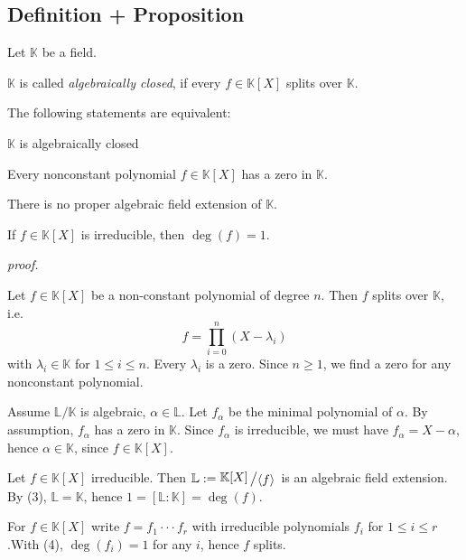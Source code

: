 \documentclass[12pt]{book}
\newcommand{\slant}[2]{{\raisebox{.1em}{$#1$}\left/\raisebox{-.1em}{$#2$}\right.}}
\begin{document}
\begin{spacing}{1.3}
\begin{compactenum}
\end{compactenum}

\subsection{Definition + Proposition} %
Let $\mathbb{K}$ be a field.
\begin{compactenum}
\item $\mathbb{K}$ is called \textit{algebraically closed}, if every $f \in \mathbb{K}[X]$ splits over $\mathbb{K}$.
\item The following statements are equivalent:
\begin{compactenum}
\item $\mathbb{K}$ is algebraically closed
\item Every nonconstant polynomial $f \in \mathbb{K}[X]$ has a zero in $\mathbb{K}$.
\item There is no proper algebraic field extension of $\mathbb{K}$.
\item If $f \in \mathbb{K}[X]$ is irreducible, then $\deg(f)=1$.
\end{compactenum}
\end{compactenum}
\textit{proof.}
\begin{compactitem}
\item['(1) $\Rightarrow$ (2)'] Let $f \in \mathbb{K}[X]$ be a non-constant polynomial of degree $n$. Then $f$ splits over $\mathbb{K}$, i.e. $$f=\prod_{i=0}^n (X-\lambda_i)$$ with $\lambda_i \in \mathbb{K}$ for $1\leqslant i \leqslant n$. Every $\lambda_i$ is a zero. Since $n\geqslant 1$, we find a zero for any nonconstant polynomial.\pagebreak
\item['(2) $\Rightarrow$ (3)'] Assume $\mathbb{L}/\mathbb{K}$ is algebraic, $\alpha \in \mathbb{L}$. Let $f_{\alpha}$ be the minimal polynomial of $\alpha$. By assumption, $f_{\alpha}$ has a zero in $\mathbb{K}$. Since $f_{\alpha}$ is irreducible, we must have $f_{\alpha}=X-\alpha$, hence $\alpha \in \mathbb{K}$, since $f \in \mathbb{K}[X]$.

\item['(3) $\Rightarrow$ (4)'] Let $f \in \mathbb{K}[X]$ irreducible. Then $\mathbb{L}:=\slant{\mathbb{K}[X]}{\langle f\rangle}$ is an algebraic field extension. By (3), $\mathbb{L}=\mathbb{K}$, hence $1=[\mathbb{L}:\mathbb{K}]=\deg(f)$.
\item['(4) $\Rightarrow$ (1)'] For $f \in \mathbb{K}[X]$ write $f=f_1 \cdot \cdot \cdot f_r$ with irreducible polynomials $f_i$ for $1\leqslant i \leqslant r$.\newline With (4), $\deg(f_i)=1$ for any $i$, hence $f$ splits.
\end{compactitem}


\end{spacing}
\end{document}
